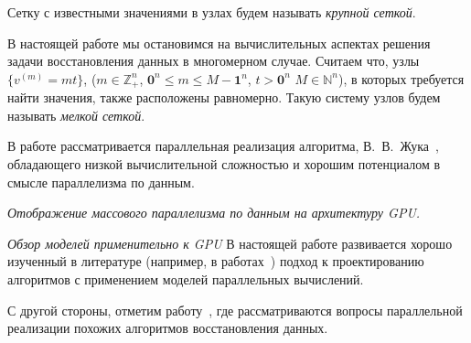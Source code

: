 Сетку с известными значениями в узлах будем называть \textit{крупной сеткой}.

В настоящей работе мы остановимся на вычислительных аспектах
решения задачи восстановления данных в многомерном случае. 
Считаем что, узлы
$ \{v^{(m)}=mt\}$,  ($m\in \mathbb{Z}_+^n$, $\mathbf{0}^n \le m \le M-\mathbf{1}^n$,
$t>\mathbf{0}^n$ $M\in \mathbb{N}^n$), 
в которых требуется найти значения, 
также расположены
равномерно.
Такую  систему узлов %
будем называть
\textit{мелкой сеткой}.



В работе рассматривается параллельная реализация
алгоритма,
В.~В.~Жука~\cite{book_Zhuk},
обладающего низкой вычислительной сложностью
и хорошим потенциалом в смысле параллелизма по данным. 

\emph{Отображение массового параллелизма по данным на архитектуру GPU.}




\emph{Обзор моделей применительно к GPU}
В настоящей работе развивается
хорошо изученный в литературе
(например, в работах~\cite{paper_Val_BSP_90, paper_BSPStreaming,  paper_McColl_Tis})
подход к проектированию
алгоритмов с применением моделей параллельных вычислений.


С другой стороны, отметим работу~\cite{paper_Mas_recv},
где рассматриваются вопросы параллельной реализации
похожих алгоритмов восстановления данных.






